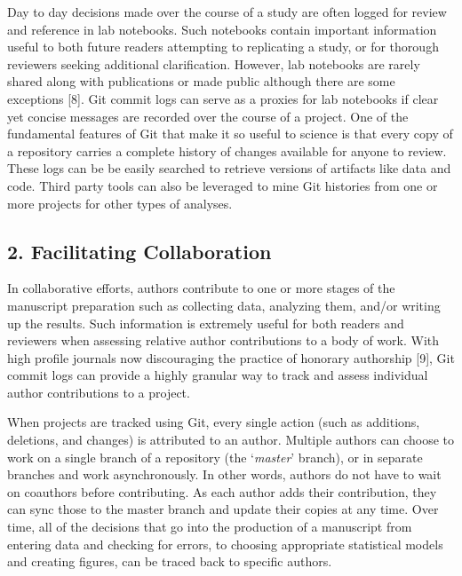 \documentclass[]{article}
\begin{document}
Day to day decisions made over the course of a study are often logged
for review and reference in lab notebooks. Such notebooks contain
important information useful to both future readers attempting to
replicating a study, or for thorough reviewers seeking additional
clarification. However, lab notebooks are rarely shared along with
publications or made public although there are some exceptions {[}8{]}.
Git commit logs can serve as a proxies for lab notebooks if clear yet
concise messages are recorded over the course of a project. One of the
fundamental features of Git that make it so useful to science is that
every copy of a repository carries a complete history of changes
available for anyone to review. These logs can be be easily searched to
retrieve versions of artifacts like data and code. Third party tools can
also be leveraged to mine Git histories from one or more projects for
other types of analyses.

\subsection{2. Facilitating Collaboration}

In collaborative efforts, authors contribute to one or more stages of
the manuscript preparation such as collecting data, analyzing them,
and/or writing up the results. Such information is extremely useful for
both readers and reviewers when assessing relative author contributions
to a body of work. With high profile journals now discouraging the
practice of honorary authorship {[}9{]}, Git commit logs can provide a
highly granular way to track and assess individual author contributions
to a project.

When projects are tracked using Git, every single action (such as
additions, deletions, and changes) is attributed to an author. Multiple
authors can choose to work on a single branch of a repository (the
`\emph{master}' branch), or in separate branches and work
asynchronously. In other words, authors do not have to wait on coauthors
before contributing. As each author adds their contribution, they can
sync those to the master branch and update their copies at any time.
Over time, all of the decisions that go into the production of a
manuscript from entering data and checking for errors, to choosing
appropriate statistical models and creating figures, can be traced back
to specific authors.
\end{document}
